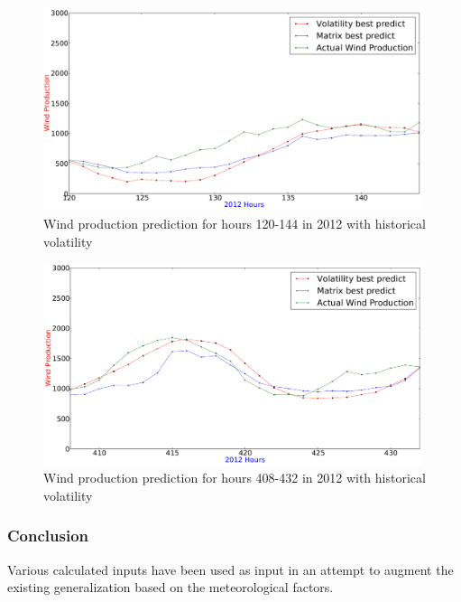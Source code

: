 \begin{figure}[H]
\centering
\includegraphics[width=0.99\textwidth]{billeder/bestVolatility120to144.png}
\caption{Wind production prediction for hours 120-144 in 2012 with historical volatility}
\label{fig:bestVolatility120to144}
\end{figure} 

\begin{figure}[H]
\centering
\includegraphics[width=0.99\textwidth]{billeder/bestVolatility408to432.png}
\caption{Wind production prediction for hours 408-432 in 2012 with historical volatility}
\label{fig:bestVolatility408to432}
\end{figure} 

\subsubsection{Conclusion}
Various calculated inputs have been used as input in an attempt to augment the existing generalization based on the meteorological factors. 

